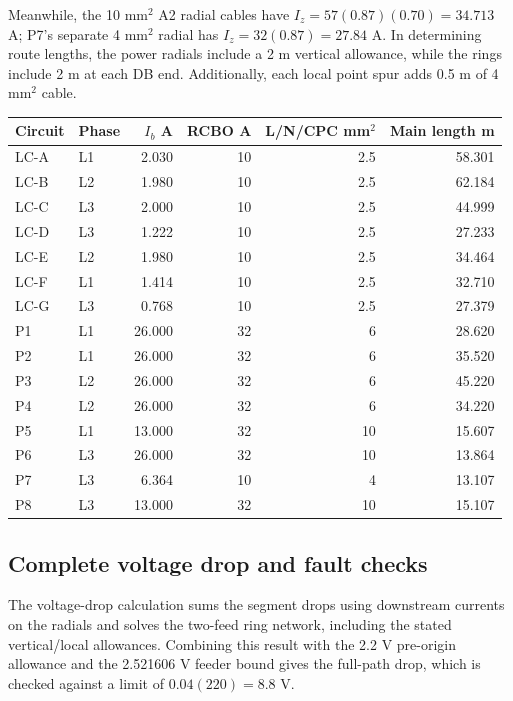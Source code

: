 Meanwhile, the 10 mm$^2$ A2 radial cables have $I_z=57(0.87)(0.70)=34.713$ A;  P7's separate 4 mm$^2$ radial has $I_z=32(0.87)=27.84$ A. In determining route lengths, the power radials include a 2 m vertical allowance, while the rings include 2 m at each DB end. Additionally, each local point spur adds 0.5 m of 4 mm$^2$ cable.
\begin{longtable}{llrrrr}\toprule
Circuit & Phase & $I_b$ A & RCBO A & L/N/CPC mm$^2$ & Main length m\\\midrule\endhead

LC-A & L1 & 2.030 & 10 & 2.5 & 58.301 \\
LC-B & L2 & 1.980 & 10 & 2.5 & 62.184 \\
LC-C & L3 & 2.000 & 10 & 2.5 & 44.999 \\
LC-D & L3 & 1.222 & 10 & 2.5 & 27.233 \\
LC-E & L2 & 1.980 & 10 & 2.5 & 34.464 \\
LC-F & L1 & 1.414 & 10 & 2.5 & 32.710 \\
LC-G & L3 & 0.768 & 10 & 2.5 & 27.379 \\
P1 & L1 & 26.000 & 32 & 6 & 28.620 \\
P2 & L1 & 26.000 & 32 & 6 & 35.520 \\
P3 & L2 & 26.000 & 32 & 6 & 45.220 \\
P4 & L2 & 26.000 & 32 & 6 & 34.220 \\
P5 & L1 & 13.000 & 32 & 10 & 15.607 \\
P6 & L3 & 26.000 & 32 & 10 & 13.864 \\
P7 & L3 & 6.364 & 10 & 4 & 13.107 \\
P8 & L3 & 13.000 & 32 & 10 & 15.107 \\

\bottomrule\end{longtable}
\subsection*{Complete voltage drop and fault checks}
The voltage-drop calculation sums the segment drops using downstream currents on the radials and solves the two-feed ring network, including the stated vertical/local allowances. Combining this result with the 2.2 V pre-origin allowance and the 2.521606 V feeder bound gives the full-path drop, which is checked against a limit of $0.04(220)=8.8$ V.

